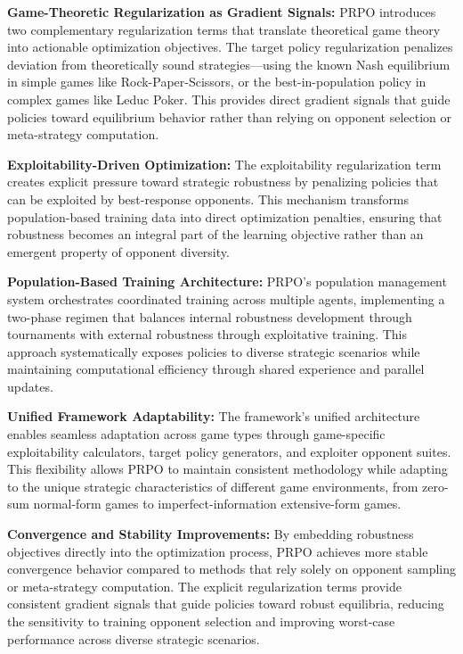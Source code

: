 \documentclass[sigconf,anonymous]{aamas}
\begin{document}
\textbf{Game-Theoretic Regularization as Gradient Signals:} PRPO introduces two complementary regularization terms that translate theoretical game theory into actionable optimization objectives. The target policy regularization penalizes deviation from theoretically sound strategies—using the known Nash equilibrium in simple games like Rock-Paper-Scissors, or the best-in-population policy in complex games like Leduc Poker. This provides direct gradient signals that guide policies toward equilibrium behavior rather than relying on opponent selection or meta-strategy computation.

\textbf{Exploitability-Driven Optimization:} The exploitability regularization term creates explicit pressure toward strategic robustness by penalizing policies that can be exploited by best-response opponents. This mechanism transforms population-based training data into direct optimization penalties, ensuring that robustness becomes an integral part of the learning objective rather than an emergent property of opponent diversity.

\textbf{Population-Based Training Architecture:} PRPO's population management system orchestrates coordinated training across multiple agents, implementing a two-phase regimen that balances internal robustness development through tournaments with external robustness through exploitative training. This approach systematically exposes policies to diverse strategic scenarios while maintaining computational efficiency through shared experience and parallel updates.

\textbf{Unified Framework Adaptability:} The framework's unified architecture enables seamless adaptation across game types through game-specific exploitability calculators, target policy generators, and exploiter opponent suites. This flexibility allows PRPO to maintain consistent methodology while adapting to the unique strategic characteristics of different game environments, from zero-sum normal-form games to imperfect-information extensive-form games.

\textbf{Convergence and Stability Improvements:} By embedding robustness objectives directly into the optimization process, PRPO achieves more stable convergence behavior compared to methods that rely solely on opponent sampling or meta-strategy computation. The explicit regularization terms provide consistent gradient signals that guide policies toward robust equilibria, reducing the sensitivity to training opponent selection and improving worst-case performance across diverse strategic scenarios.
\end{document}
